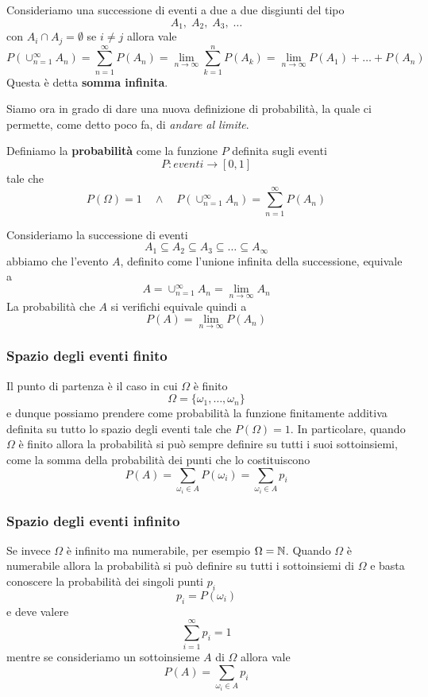 \begin{theorem}
	Consideriamo una successione di eventi a due a due disgiunti del tipo
	\[ A_1, \; A_2, \; A_3, \; \dots \]
	con $A_i \cap A_j = \emptyset$ se $i \neq j$ allora vale
	\[
		P(\cup_{n=1}^\infty A_n) = \sum_{n=1}^\infty P(A_n) =
		\lim_{n \to \infty} \sum_{k=1}^n P(A_k) = 	\lim_{n \to \infty} P(A_1) + \dots + P(A_n)
	\]
	Questa è detta \textbf{somma infinita}.
\end{theorem}

Siamo ora in grado di dare una nuova definizione di probabilità, la quale ci permette, come detto
poco fa, di \emph{andare al limite}.
\begin{definition}
	Definiamo la \textbf{probabilità} come la funzione $P$ definita sugli eventi
	\[ P : eventi \to [0, 1] \]
	tale che
	\[
		P(\Omega) = 1 \quad \land \quad
		P(\cup_{n=1}^\infty A_n) = \sum_{n=1}^\infty P(A_n)
	\]
\end{definition}

Consideriamo la successione di eventi
\[ A_1 \subseteq A_2 \subseteq A_3 \subseteq \dots \subseteq A_\infty \]
abbiamo che l'evento $A$, definito come l'unione infinita della successione, equivale a
\[ A = \cup_{n=1}^\infty A_n = \lim_{n \to \infty} A_n \]
La probabilità che $A$ si verifichi equivale quindi a
\[ P(A) = \lim_{n \to \infty} P(A_n) \]

\subsubsection{Spazio degli eventi finito}
Il punto di partenza è il caso in cui $\Omega$ è finito
\[ \Omega = \{ \omega_1, \dots, \omega_n \} \]
e dunque possiamo prendere come probabilità la funzione finitamente additiva definita su tutto lo
spazio degli eventi tale che $P(\Omega) = 1$. In particolare, quando $\Omega$ è finito allora la
probabilità si può sempre definire su tutti i suoi sottoinsiemi, come la somma della probabilità
dei punti che lo costituiscono
\[ P(A) = \sum_{\omega_i \in A} P(\omega_i) = \sum_{\omega_i \in A} p_i \]

\subsubsection{Spazio degli eventi infinito}
Se invece $\Omega$ è infinito ma numerabile, per esempio $\Omega = \mathbb{N}$. Quando $\Omega$ è
numerabile allora la probabilità si può definire su tutti i sottoinsiemi di $\Omega$ e basta
conoscere la probabilità dei singoli punti $p_i$
\[ p_i = P(\omega_i) \]
e deve valere
\[ \sum_{i=1}^\infty p_i = 1 \]
mentre se consideriamo un sottoinsieme $A$ di $\Omega$ allora vale
\[ P(A) = \sum_{\omega_i \in A} p_i \]

